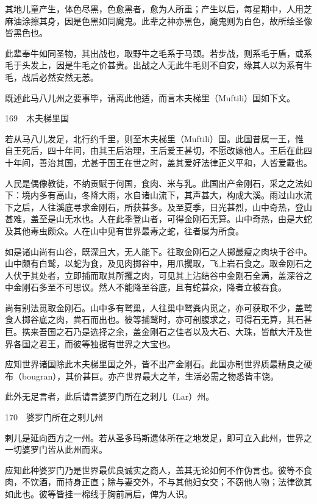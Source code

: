 \documentclass[12pt,UTF8]{ctexbook}
\begin{document}
其地儿童产生，体色尽黑，色愈黑者，愈为人所重；产生以后，每星期中，人用芝麻油涂擦其身，因是色黑如同魔鬼。此辈之神亦黑色，魔鬼则为白色，故所绘圣像皆黑色也。

此辈奉牛如同圣物，其出战也，取野牛之毛系于马颈。若步战，则系毛于盾，或系毛于头发上，因是牛毛之价甚贵。出战之人无此牛毛则不自安，缘其人以为系有牛毛，战后必然安然无恙。

既述此马八儿州之要事毕，请离此他适，而言木夫梯里（Muftili）国如下文。





169　木夫梯里国

若从马八儿发足，北行约千里，则至木夫梯里（Muftili）国。此国昔属一王，惟自王死后，四十年间，由其王后治理，王后爱王甚切，不愿改嫁他人。王后在此四十年间，善治其国，尤甚于国王在世之时，盖其爱好法律正义平和，人皆爱戴也。

人民是偶像教徒，不纳贡赋于何国，食肉、米与乳。此国出产金刚石，采之之法如下：境内多有高山，冬降大雨，水自诸山流下，其声甚大，构成大溪。雨过山水流下之后，人往溪底寻求金刚石，所获甚多。及至夏季，日光甚烈，山中奇热，登山甚难，盖至是山无水也。人在此季登山者，可得金刚石无算。山中奇热，由是大蛇及其他毒虫颇众。人在山中见有世界最毒之蛇，往者屡为所食。

如是诸山尚有山谷，既深且大，无人能下。往取金刚石之人掷最瘦之肉块于谷中。山中颇有白鹫，以蛇为食，及见肉掷谷中，用爪攫取，飞上岩石食之。取金刚石之人伏于其处者，立即捕而取其所攫之肉，可见其上沾结谷中金刚石全满，盖深谷之中金刚石多至不可思议。然人不能降至谷底，且有蛇甚众，降者立被吞食。

尚有别法觅取金刚石。山中多有鹫巢，人往巢中鹫粪内觅之，亦可获取不少，盖鹫食人掷谷底之肉，粪石而出也。彼等捕鹫时，亦可剖腹求之，可得石无算，其石甚巨。携来吾国之石乃是选择之余，盖金刚石之佳者以及大石、大珠，皆献大汗及世界各国之君王，而彼等独据有世界之大宝也。

应知世界诸国除此木夫梯里国之外，皆不出产金刚石。此国亦制世界质最精良之硬布（bougran），其价甚巨。亦产世界最大之羊，生活必需之物悉皆丰饶。

此外无足言者，此后请言婆罗门所在之剌儿（Lar）州。





170　婆罗门所在之剌儿州

剌儿是延向西方之一州。若从圣多玛斯遗体所在之地发足，即可立入此州，世界之一切婆罗门皆从此州而来。

应知此种婆罗门乃是世界最优良诚实之商人，盖其无论如何不作伪言也。彼等不食肉，不饮酒，而持身正直；除与妻交外，不与其他妇女交；不窃他人物；法律欲其如此也。彼等皆挂一棉线于胸前肩后，俾为人识。
\end{document}
